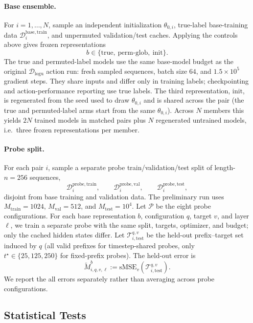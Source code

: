 \documentclass[11pt]{article}
\begin{document}
\paragraph{Base ensemble.} For $i = 1, \ldots, N$, sample an independent initialization $\theta_{0,i}$, true-label base-training data $\mathcal{D}^{\mathrm{base,train}}_i$, and unpermuted validation/test caches. Applying the controls above gives frozen representations
\[
b \in \{\mathrm{true},\ \mathrm{perm\text{-}glob},\ \mathrm{init}\}.
\]
The true and permuted-label models use the same base-model budget as the original $\mathcal{D}_{\mathrm{logu}}$ action run: fresh sampled sequences, batch size $64$, and $1.5\times 10^5$ gradient steps. They share inputs and differ only in training labels; checkpointing and action-performance reporting use true labels. The third representation, $\mathrm{init}$, is regenerated from the seed used to draw $\theta_{0,i}$ and is shared across the pair (the true and permuted-label arms start from the same $\theta_{0,i}$). Across $N$ members this yields $2N$ trained models in matched pairs plus $N$ regenerated untrained models, i.e.\ three frozen representations per member.

\paragraph{Probe split.} For each pair $i$, sample a separate probe train/validation/test split of length-$n=256$ sequences,
\[
\mathcal{D}^{\mathrm{probe,train}}_i,\qquad
\mathcal{D}^{\mathrm{probe,val}}_i,\qquad
\mathcal{D}^{\mathrm{probe,test}}_i,
\]
disjoint from base training and validation data. The preliminary run uses $M_{\mathrm{train}}=1024$, $M_{\mathrm{val}}=512$, and $M_{\mathrm{test}}=10^4$. Let $\mathcal{P}$ be the eight probe configurations. For each base representation $b$, configuration $q$, target $v$, and layer $\ell$, we train a separate probe with the same split, targets, optimizer, and budget; only the cached hidden states differ. Let $\mathcal{T}^{q,v}_{i,\mathrm{test}}$ be the held-out prefix--target set induced by $q$ (all valid prefixes for timestep-shared probes, only $t^\star\in\{25,125,250\}$ for fixed-prefix probes). The held-out error is
\[
\widetilde M^{b}_{i,q,v,\ell}
:=
\mathrm{sMSE}_v(\mathcal{T}^{q,v}_{i,\mathrm{test}}).
\]
We report the all errors separately rather than averaging across probe configurations.

\subsection{Statistical Tests}
\label{sec:probe-statistical-tests}
\end{document}
